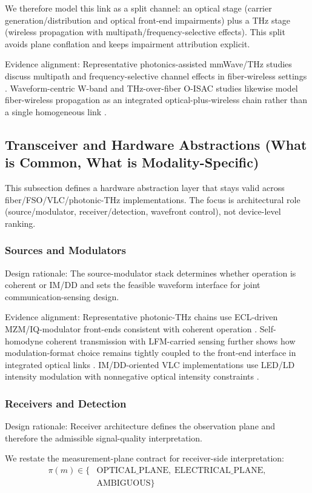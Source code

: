 \documentclass[letterpaper,journal]{IEEEtran}
\begin{document}
We therefore model this link as a split channel: an optical stage (carrier generation/distribution and optical front-end impairments) plus a THz stage (wireless propagation with multipath/frequency-selective effects). This split avoids plane conflation and keeps impairment attribution explicit.

Evidence alignment: Representative photonics-assisted mmWave/THz studies discuss multipath and frequency-selective channel effects in fiber-wireless settings \cite{O_ISAC_241,O_ISAC_077}. Waveform-centric W-band and THz-over-fiber O-ISAC studies likewise model fiber-wireless propagation as an integrated optical-plus-wireless chain rather than a single homogeneous link \cite{O_ISAC_047,O_ISAC_065,O_ISAC_119}.
\subsection{Transceiver and Hardware Abstractions (What is Common, What is Modality-Specific)}
This subsection defines a hardware abstraction layer that stays valid across fiber/FSO/VLC/photonic-THz implementations. The focus is architectural role (source/modulator, receiver/detection, wavefront control), not device-level ranking.

\subsubsection{Sources and Modulators}
Design rationale: The source-modulator stack determines whether operation is coherent or IM/DD and sets the feasible waveform interface for joint communication-sensing design.

Evidence alignment: Representative photonic-THz chains use ECL-driven MZM/IQ-modulator front-ends consistent with coherent operation \cite{O_ISAC_029}. Self-homodyne coherent transmission with LFM-carried sensing further shows how modulation-format choice remains tightly coupled to the front-end interface in integrated optical links \cite{O_ISAC_079}. IM/DD-oriented VLC implementations use LED/LD intensity modulation with nonnegative optical intensity constraints \cite{O_ISAC_001}.

\subsubsection{Receivers and Detection}
Design rationale: Receiver architecture defines the observation plane and therefore the admissible signal-quality interpretation.

We restate the measurement-plane contract for receiver-side interpretation:
\begin{equation}
    \label{eq:receiver_plane_contract}
    \begin{aligned}
        \pi(m)\in\{ & \text{OPTICAL\_PLANE},\;\text{ELECTRICAL\_PLANE}, \\
                    & \text{AMBIGUOUS}\}
    \end{aligned}
\end{equation}
\end{document}
